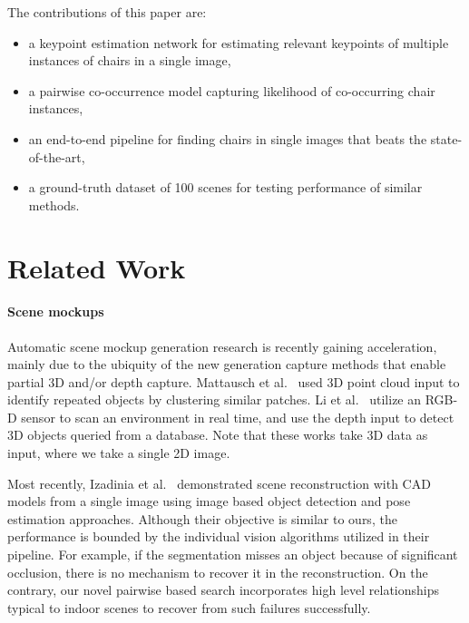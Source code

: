 \documentclass[10pt,twocolumn,letterpaper]{article}
\begin{document}
%
The contributions of this paper are:

\begin{itemize}
    \item a keypoint estimation network for estimating relevant keypoints of
          multiple instances of chairs in a single image,
    \item a pairwise co-occurrence model capturing likelihood of co-occurring
          chair instances,
    \item an end-to-end pipeline for finding chairs in single images
          that beats the state-of-the-art,
    \item a ground-truth dataset of 100 scenes for testing performance of similar methods.
\end{itemize}
\section{Related Work}
\label{sec:related}

\paragraph{Scene mockups} Automatic scene mockup generation research is recently
gaining acceleration, mainly due to the ubiquity of the new generation capture
methods that enable partial 3D and/or depth capture.
Mattausch et al.~\cite{Mattausch:2014:CGF} used 3D point cloud input to identify
repeated objects by clustering similar patches. Li et al.~\cite{Li:2015:CGF}
utilize an RGB-D sensor to scan an environment in real time, and use the depth
input to detect 3D objects queried from a database. Note that these works take
3D data as input, where we take a single 2D image.

Most recently, Izadinia et al.~\cite{Izadinia:2016:Arxiv} demonstrated
scene reconstruction with CAD models from a single image using image based
object detection and pose estimation approaches. Although their objective is
similar to ours, the performance is bounded by the individual vision algorithms
utilized in their pipeline. For example, if the segmentation misses an object
because of significant occlusion, there is no mechanism to recover it in the
reconstruction. On the contrary, our novel pairwise based search incorporates
high level relationships typical to indoor scenes to recover from such failures
successfully.
\end{document}
